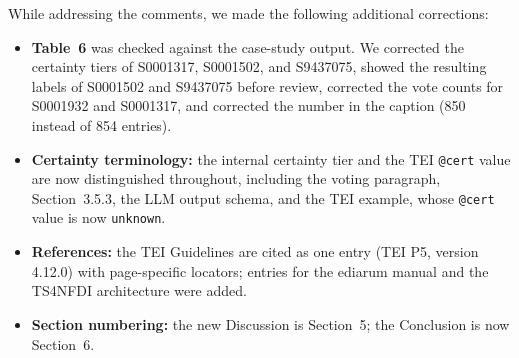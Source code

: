 \documentclass[11pt,a4paper]{article}
\begin{document}
While addressing the comments, we made the following additional corrections:
\begin{itemize}
  \item \textbf{Table~6} was checked against the case-study output. We corrected the certainty tiers
        of S0001317, S0001502, and S9437075, showed the resulting labels of S0001502 and S9437075
        before review, corrected the vote counts for S0001932 and S0001317, and corrected the number
        in the caption (850 instead of 854 entries).
  \item \textbf{Certainty terminology:} the internal certainty tier and the TEI \texttt{@cert} value
        are now distinguished throughout, including the voting paragraph, Section~3.5.3, the LLM
        output schema, and the TEI example, whose \texttt{@cert} value is now \texttt{unknown}.
  \item \textbf{References:} the TEI Guidelines are cited as one entry (TEI P5, version 4.12.0) with
        page-specific locators; entries for the ediarum manual and the TS4NFDI architecture were added.
  \item \textbf{Section numbering:} the new Discussion is Section~5; the Conclusion is now Section~6.
\end{itemize}
\end{document}
